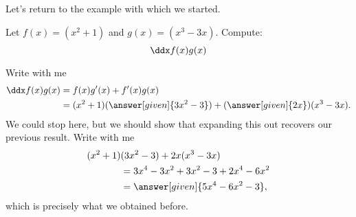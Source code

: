 \documentclass{ximera}
\begin{document}



Let's return to the example with which we started.
\begin{example} 
	Let $f(x)=(x^2+1)$ and $g(x)=(x^3-3x)$. Compute:
	\[ \ddx f(x)g(x)\]
	
	\begin{explanation}
		Write with me
		\begin{align*}
			\ddx f(x)g(x) &= f(x)g'(x) + f'(x)g(x)\\
				&=(x^2+1)(\answer[given]{3x^2-3}) + (\answer[given]{2x})(x^3-3x).
		\end{align*}
		We could stop here, but we should show that expanding this out recovers
		our previous result. Write with me
		\begin{align*}
			(x^2+1)&(3x^2-3) + 2x(x^3-3x)\\
				&= 3x^4-3x^2 +3x^2 -3 + 2x^4-6x^2\\
				&=\answer[given]{5x^4-6x^2-3},
		\end{align*}
		which is precisely what we obtained before.
	\end{explanation}
\end{example}
\end{document}
